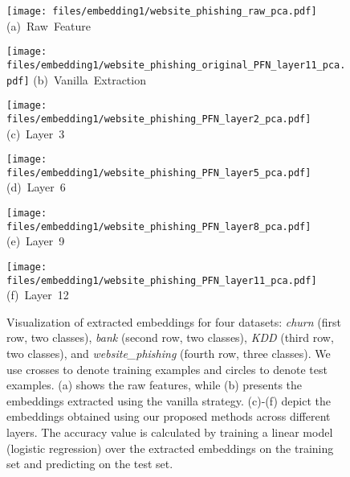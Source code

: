 \begin{figure*}[t]
    \begin{minipage}{0.16\linewidth}
    \texttt{[image: files/embedding1/website\_phishing\_raw\_pca.pdf]}
    \centering
    {\small \mbox{(a) {Raw Feature}}}
    \end{minipage}
    \begin{minipage}{0.16\linewidth}
    \texttt{[image: files/embedding1/website\_phishing\_original\_PFN\_layer11\_pca.pdf]}
    \centering
    {\small \mbox{(b) {Vanilla Extraction}}}
    \end{minipage}
\begin{minipage}{0.16\linewidth}
    \texttt{[image: files/embedding1/website\_phishing\_PFN\_layer2\_pca.pdf]}
    \centering
    {\small \mbox{(c) {Layer 3}}}
    \end{minipage}
    \begin{minipage}{0.16\linewidth}
    \texttt{[image: files/embedding1/website\_phishing\_PFN\_layer5\_pca.pdf]}
    \centering
    {\small \mbox{(d) {Layer 6}}}
    \end{minipage}
       \begin{minipage}{0.16\linewidth}
    \texttt{[image: files/embedding1/website\_phishing\_PFN\_layer8\_pca.pdf]}
    \centering
    {\small \mbox{(e) {Layer 9}}}
    \end{minipage}
    \begin{minipage}{0.16\linewidth}
    \texttt{[image: files/embedding1/website\_phishing\_PFN\_layer11\_pca.pdf]}
    \centering
    {\small \mbox{(f) {Layer 12}}}
    \end{minipage}
    \vspace{-1mm}
  \caption{
Visualization of extracted embeddings for four datasets: {\it churn} (first row, two classes), {\it bank} (second row, two classes), {\it KDD} (third row, two classes), and {\it website\_phishing} (fourth row, three classes).
We use crosses to denote training examples and circles to denote test examples.
(a) shows the raw features, while (b) presents the embeddings extracted using the vanilla strategy.
(c)-(f) depict the embeddings obtained using our proposed methods across different layers.
The accuracy value is calculated by training a linear model (logistic regression) over the extracted embeddings on the training set and predicting on the test set.
  }
      \vspace{-2mm}
  \label{fig:our_extraction}
\end{figure*}

